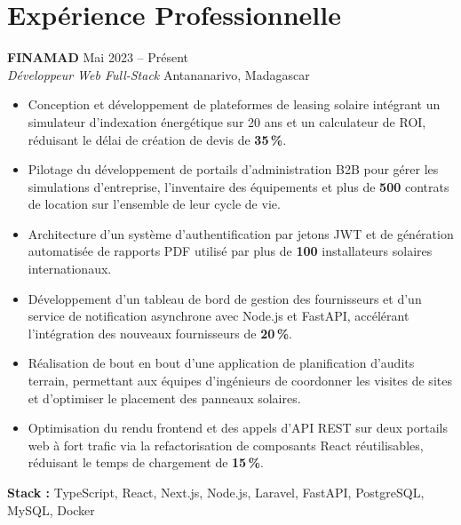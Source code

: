 \documentclass[10pt,a4paper]{article}
\newcommand{\entry}[4]{%
  {\bfseries #1} \hfill {\color{muted}#2}\\
  {\color{accent}\itshape #3} \hfill {\color{muted}\small #4}\par
  \vspace{1pt}}
\begin{document}
\vfill

\section*{Expérience Professionnelle}
\entry{FINAMAD}{Mai 2023 -- Présent}%
{Développeur Web Full-Stack}{Antananarivo, Madagascar}
\begin{itemize}
  \item Conception et développement de plateformes de leasing solaire intégrant
        un simulateur d'indexation énergétique sur 20 ans et un calculateur de
        ROI, réduisant le délai de création de devis de \textbf{35\,\%}.
  \item Pilotage du développement de portails d'administration B2B pour gérer
        les simulations d'entreprise, l'inventaire des équipements et plus de
        \textbf{500} contrats de location sur l'ensemble de leur cycle de vie.
  \item Architecture d'un système d'authentification par jetons JWT et de
        génération automatisée de rapports PDF utilisé par plus de
        \textbf{100} installateurs solaires internationaux.
  \item Développement d'un tableau de bord de gestion des fournisseurs et d'un
        service de notification asynchrone avec Node.js et FastAPI, accélérant
        l'intégration des nouveaux fournisseurs de \textbf{20\,\%}.
  \item Réalisation de bout en bout d'une application de planification d'audits
        terrain, permettant aux équipes d'ingénieurs de coordonner les visites
        de sites et d'optimiser le placement des panneaux solaires.
  \item Optimisation du rendu frontend et des appels d'API REST sur deux
        portails web à fort trafic via la refactorisation de composants React
        réutilisables, réduisant le temps de chargement de \textbf{15\,\%}.
\end{itemize}
\vspace{2pt}
{\small\color{muted}\textbf{Stack :} TypeScript, React, Next.js, Node.js, Laravel,
FastAPI, PostgreSQL, MySQL, Docker}

\vfill

\end{document}

